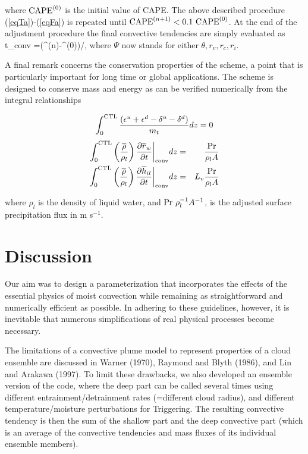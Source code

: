 \noindent
where ${\rm CAPE}^{(0)}$ is the initial value of CAPE.
The above described procedure
(\ref{eqTa})-(\ref{eqFa}) is repeated until
${\rm CAPE}^{(n+1)} < 0.1\,\, {\rm CAPE}^{(0)}$.
At the end of the adjustment procedure the final convective tendencies
are simply evaluated as
\beq
 {\partial\overline{\Psi}\over\partial t}\bigg\vert_{\rm conv}
 =(\overline{\Psi}^{(n)}-\overline{\Psi}^{(0)})/\tau,
\label{eqTH}
\eeq
where $\Psi$ now stands for either $\theta, r_v, r_c, r_i$.

A final remark concerns the conservation properties of the scheme, a
point that is particularly important for long time or global applications.
The scheme is designed to conserve mass and energy
as can be verified numerically from the  integral relationships

\begin{eqnarray}
\int_0^{\rm CTL}{(\epsilon^u+\epsilon^d-\delta^u-\delta^d)
\over m_t} dz = 0
\end{eqnarray}
\begin{eqnarray}
\int_{0}^{\rm CTL}  \left( {\overline{\rho}\over\rho_l}\right)
{\partial\overline{r}_w\over \partial t}\bigg\vert_{\rm conv} dz &=&
{{\rm Pr}\over \rho_l A }\\
\int_0^{\rm CTL} \left( {\overline{\rho}\over\rho_l}\right)
 {\partial\overline{h}_{il}\over\partial t}\bigg\vert_{\rm conv} dz &= &
L_v {{\rm Pr}\over \rho_l A }
\label{econs}
\end{eqnarray}

\noindent
where
 $\rho_l$ is the density of liquid water, and
${\rm Pr}\,\,\rho_l^{-1} A^{-1}$,
 is the adjusted surface precipitation flux in m s$^{-1}$.

\section{Discussion}
Our aim was to design a parameterization that incorporates the effects of the
essential physics of moist convection while remaining as straightforward and
numerically efficient as possible.  In adhering to these guidelines, however,
it is inevitable that numerous simplifications of real physical processes become
necessary.  

The limitations of a convective plume model to represent properties of a cloud ensemble
are discussed in Warner (1970), Raymond and Blyth (1986), and Lin and Arakawa (1997). 
To limit these drawbacks, we also developed an ensemble version of the code, where
the deep part can be called several times using different entrainment/detrainment rates
(=different cloud radius), and different temperature/moisture perturbations for Triggering.
The resulting convective tendency is then the sum of the shallow part and the deep
convective part (which is an average of the convective tendencies and mass fluxes  of 
its individual ensemble members).



